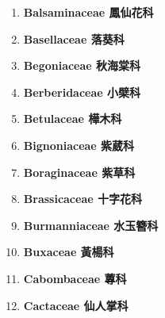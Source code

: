 \begin{enumerate}
        
      \item[] \begin{small}\textbf{Balsaminaceae 鳳仙花科} \end{small}
        
      \item[] \begin{small}\textbf{Basellaceae 落葵科} \end{small}
        
      \item[] \begin{small}\textbf{Begoniaceae 秋海棠科} \end{small}
        
      \item[] \begin{small}\textbf{Berberidaceae 小檗科} \end{small}
        
      \item[] \begin{small}\textbf{Betulaceae 樺木科} \end{small}
        
      \item[] \begin{small}\textbf{Bignoniaceae 紫葳科} \end{small}
        
      \item[] \begin{small}\textbf{Boraginaceae 紫草科} \end{small}
        
      \item[] \begin{small}\textbf{Brassicaceae 十字花科} \end{small}
        
      \item[] \begin{small}\textbf{Burmanniaceae 水玉簪科} \end{small}
        
      \item[] \begin{small}\textbf{Buxaceae 黃楊科} \end{small}
        
      \item[] \begin{small}\textbf{Cabombaceae 蓴科} \end{small}
        
      \item[] \begin{small}\textbf{Cactaceae 仙人掌科} \end{small}

\end{enumerate}
